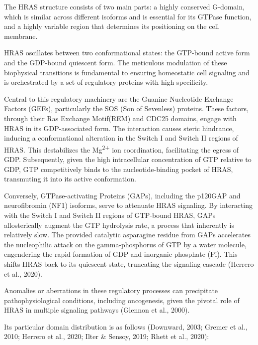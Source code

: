 \documentclass{article}
\begin{document}
The HRAS structure consists of two main parts: a highly conserved G-domain, which is similar across different isoforms and is essential for its GTPase function, and a highly variable region that determines its positioning on the cell membrane.

HRAS oscillates between two conformational states: the GTP-bound active form and the GDP-bound quiescent form. The meticulous modulation of these biophysical transitions is fundamental to ensuring homeostatic cell signaling and is orchestrated by a set of regulatory proteins with high specificity.

Central to this regulatory machinery are the Guanine Nucleotide Exchange Factors (GEFs), particularly the SOS (Son of Sevenless) proteins. These factors, through their Ras Exchange Motif(REM) and CDC25 domains, engage with HRAS in its GDP-associated form. The interaction causes steric hindrance, inducing a conformational alteration in the Switch I and Switch II regions of HRAS. This destabilizes the Mg\textsuperscript{2+} ion coordination, facilitating the egress of GDP. Subsequently, given the high intracellular concentration of GTP relative to GDP, GTP competitively binds to the nucleotide-binding pocket of HRAS, transmuting it into its active conformation.

Conversely, GTPase-activating Proteins (GAPs), including the p120GAP and neurofibromin (NF1) isoforms, serve to attenuate HRAS signaling. By interacting with the Switch I and Switch II regions of GTP-bound HRAS, GAPs allosterically augment the GTP hydrolysis rate, a process that inherently is relatively slow. The provided catalytic asparagine residue from GAPs accelerates the nucleophilic attack on the gamma-phosphorus of GTP by a water molecule, engendering the rapid formation of GDP and inorganic phosphate (Pi). This shifts HRAS back to its quiescent state, truncating the signaling cascade (Herrero et al., 2020).

Anomalies or aberrations in these regulatory processes can precipitate pathophysiological conditions, including oncogenesis, given the pivotal role of HRAS in multiple signaling pathways (Glennon et al., 2000).

Its particular domain distribution is as follows (Downward, 2003; Gremer et al., 2010; Herrero et al., 2020; Ilter \& Sensoy, 2019; Rhett et al., 2020):
\end{document}
